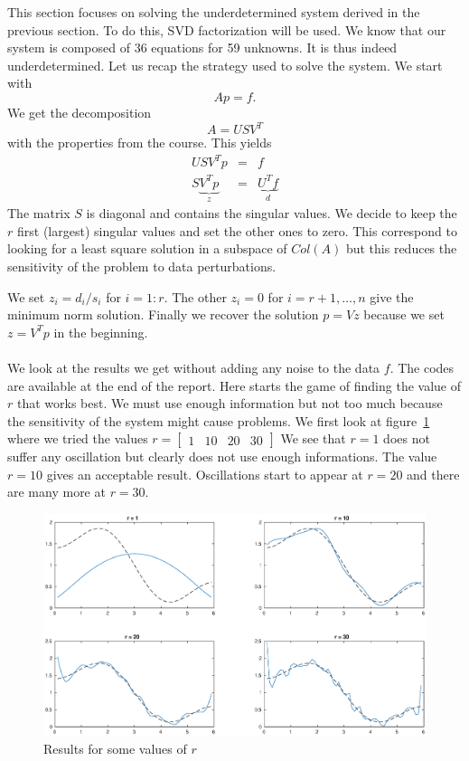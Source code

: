 This section focuses on solving the underdetermined system derived in the previous section. To do this, SVD factorization will be used. \newline
We know that our system is composed of 36 equations for 59 unknowns. It is thus indeed underdetermined. Let us recap the strategy used to solve the system. We start with $$Ap=f.$$
We get the decomposition $$A = USV^{T}$$
with the properties from the course.
This yields
\begin{eqnarray*}
USV^{T}p & = & f\\
S\underbrace{V^{T }p}_{z} & = & \underbrace{U^{T}f}_{d}
\end{eqnarray*}
The matrix $S$ is diagonal and contains the singular values. We decide to keep the $r$ first (largest) singular values and set the other ones to zero. This correspond to looking for a least square solution in a subspace of $Col(A)$ but this reduces the sensitivity of the problem to data perturbations.


We set $z_{i}= d_{i}/s_{i}$ for $i = 1:r$. The other $z_{i}=0$ for $i = r+1,\dots,n$ give the minimum norm solution. Finally we recover the solution $p=Vz$ because we set $z=V^{T}p$ in the beginning.

\paragraph*{}
We look at the results we get without adding any noise to the data $f$. The codes are available at the end of the report. Here starts the game of finding the value of $r$ that works best. We must use enough information but not too much because the sensitivity of the system might cause problems. We first look at figure~\ref{fig:nn0} where we tried the values $r= \begin{bmatrix}
1 & 10 & 20 & 30 
\end{bmatrix}$
We see that $r=1$ does not suffer any oscillation but clearly does not use enough informations. The value $r=10$ gives an acceptable result. Oscillations start to appear at $r=20$ and there are many more at $r=30$.
\begin{figure}[!h]
\centering
\includegraphics[scale = 0.5]{./nn0.eps}
\caption{Results for some values of $r$}
\label{fig:nn0}
\end{figure}

